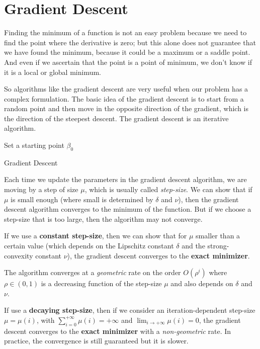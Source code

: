\section{Gradient Descent}
Finding the minimum of a function is not an easy problem because we need to find the point where the derivative is zero; but this alone does not guarantee that we have found the minimum, because it could be a maximum or a saddle point. And even if we ascertain that the point is a point of minimum, we don't know if it is a local or global minimum.

So algorithms like the gradient descent are very useful when our problem has a complex formulation.
The basic idea of the gradient descent is to start from a random point and then move in the opposite direction of the gradient, which is the direction of the steepest descent. The gradient descent is an iterative algorithm.

\begin{algorithm}[H]
    \SetAlgoLined
    Set a starting point $\beta_0$ \\
    \caption{Gradient Descent}
\end{algorithm}

Each time we update the parameters in the gradient descent algorithm, we are moving by a step of size $\mu$, which is usually called \textit{step-size}. We can show that if $\mu$ is small enough (where small is determined by $\delta$ and $\nu$), then the gradient descent algorithm converges to the minimum of the function. But if we choose a step-size that is too large, then the algorithm may not converge.

If we use a \textbf{constant step-size}, then we can show that for $\mu$ smaller than a certain value (which depends on the Lipschitz constant $\delta$ and the strong-convexity constant $\nu$), the gradient descent converges to the \textbf{exact minimizer}.


The algorithm converges at a \textit{geometric} rate on the order $O(\rho^i)$ where $\rho \in (0,1)$ is a decreasing function of the step-size $\mu$ and also depends on $\delta$ and $\nu$.

If use a \textbf{decaying step-size}, then if we consider an iteration-dependent step-size $\mu = \mu(i)$, with $\sum_{i=0}^{+\infty} \mu(i) = +\infty$ and $\lim_{i \to +\infty} \mu(i) = 0$, the gradient descent converges to the \textbf{exact minimizer} with a \textit{non-geometric} rate. In practice, the convergence is still guaranteed but it is slower.

